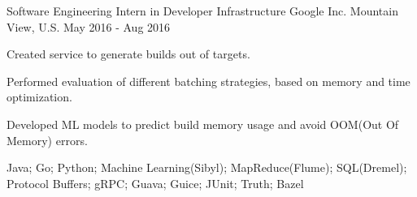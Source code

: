 

\begin{cventries}


  \cventry
    {Software Engineering Intern in Developer Infrastructure} %
    {Google Inc.} %
    {Mountain View, U.S.} %
    {May 2016 - Aug 2016} %
    {
      \begin{cvitems} %
        \item {Created service to generate builds out of targets.}
        \item {Performed evaluation of different batching strategies, based on memory and time optimization.}
        \item {Developed ML models to predict build memory usage and avoid OOM(Out Of Memory) errors.}
        \item {Java; Go; Python; Machine Learning(Sibyl); MapReduce(Flume); SQL(Dremel); Protocol Buffers; gRPC; Guava; Guice; JUnit; Truth; Bazel}
      \end{cvitems}
    }

\end{cventries}
